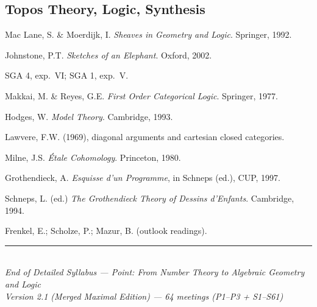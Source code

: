 \documentclass[11pt,a4paper]{article}
\begin{document}
	\subsection*{Topos Theory, Logic, Synthesis}
	\begin{enumerate}[label={[\arabic*]},resume]
		\item Mac Lane, S. \& Moerdijk, I. \emph{Sheaves in Geometry and Logic}. Springer, 1992.
		\item Johnstone, P.T. \emph{Sketches of an Elephant}. Oxford, 2002.
		\item SGA 4, exp.\ VI; SGA 1, exp.\ V.
		\item Makkai, M. \& Reyes, G.E. \emph{First Order Categorical Logic}. Springer, 1977.
		\item Hodges, W. \emph{Model Theory}. Cambridge, 1993.
		\item Lawvere, F.W. (1969), diagonal arguments and cartesian closed categories.
		\item Milne, J.S. \emph{\'Etale Cohomology}. Princeton, 1980.
		\item Grothendieck, A. \emph{Esquisse d'un Programme}, in Schneps (ed.), CUP, 1997.
		\item Schneps, L. (ed.) \emph{The Grothendieck Theory of Dessins d'Enfants}. Cambridge, 1994.
		\item Frenkel, E.; Scholze, P.; Mazur, B. (outlook readings).
	\end{enumerate}
	
	\vspace{1.5em}
	\begin{center}
		\rule{0.6\textwidth}{0.4pt}\\[0.5em]
		\textit{End of Detailed Syllabus --- Point: From Number Theory to Algebraic Geometry and Logic}\\
		\textit{Version 2.1 (Merged Maximal Edition) --- 64 meetings (P1--P3 + S1--S61)}
	\end{center}
	
\end{document}
